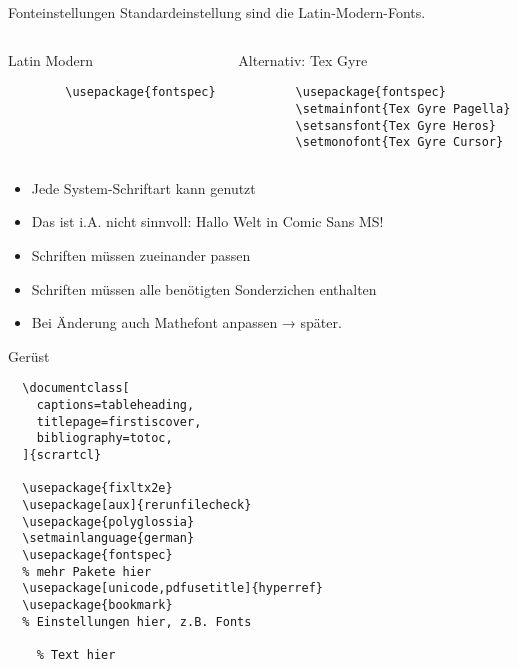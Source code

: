 \begin{frame}[fragile]{Fonteinstellungen}
  Standardeinstellung sind die Latin-Modern-Fonts.
  \vspace{1em}
  \begin{columns}[onlytextwidth, t]
    \begin{column}{0.48\textwidth}
      \begin{block}{Latin Modern}
        \begin{lstlisting}
        \usepackage{fontspec}
        \end{lstlisting}
      \end{block}
    \end{column}
    \begin{column}{0.48\textwidth}
      \begin{block}{Alternativ: Tex Gyre}
        \begin{lstlisting}
        \usepackage{fontspec}
        \setmainfont{Tex Gyre Pagella}
        \setsansfont{Tex Gyre Heros}
        \setmonofont{Tex Gyre Cursor}
        \end{lstlisting}
      \end{block}
    \end{column}
  \end{columns}
  \begin{itemize}
    \item Jede System-Schriftart kann genutzt
    \item \alert{Das ist i.A. nicht sinnvoll:  Hallo Welt in Comic Sans MS!}
    \item Schriften müssen zueinander passen
    \item Schriften müssen alle benötigten Sonderzichen enthalten
    \item Bei Änderung auch Mathefont anpassen → später.
  \end{itemize}
\end{frame}

\begin{frame}[fragile]{Gerüst}
  \begin{lstlisting}
  \documentclass[
    captions=tableheading,
    titlepage=firstiscover,
    bibliography=totoc,
  ]{scrartcl}

  \usepackage{fixltx2e}
  \usepackage[aux]{rerunfilecheck}
  \usepackage{polyglossia}
  \setmainlanguage{german}
  \usepackage{fontspec}
  % mehr Pakete hier
  \usepackage[unicode,pdfusetitle]{hyperref}
  \usepackage{bookmark}
  % Einstellungen hier, z.B. Fonts
  
    % Text hier
  
  \end{lstlisting}
\end{frame}

